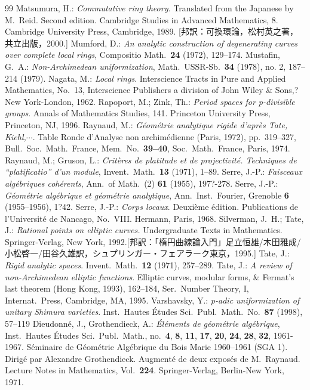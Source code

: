 \documentclass[a4paper,12pt, dvipdfmx]{jsbook}
\theoremstyle{plain}
\theoremstyle{definition}
\begin{document}
\begin{thebibliography}{99}
Matsumura, H.: {\sl Commutative ring theory.} Translated from the Japanese by M.\ Reid. Second edition. Cambridge Studies in Advanced Mathematics, 8. Cambridge University Press, Cambridge, 1989. [邦訳：可換環論，松村英之著，共立出版，2000.]
Mumford, D.: {\it An analytic construction of degenerating curves over complete local rings}, Compositio Math.\ {\bf 24} (1972), 129--174.
Mustafin, G.\ A.: {\it Non-Archimedean uniformization}, Math.\ USSR-Sb.\ {\bf 34} (1978), no. 2, 187--214 (1979).
Nagata, M.: {\it Local rings}. Interscience Tracts in Pure and Applied Mathematics, No.\ 13, Interscience Publishers a division of John Wiley \& Sons,? New York-London, 1962.
Rapoport, M.; Zink, Th.: {\it Period spaces for p-divisible groups}. Annals of Mathematics Studies, 141. Princeton University Press, Princeton, NJ, 1996.
Raynaud, M.: {\it G\'eom\'etrie analytique rigide d'apr\`es Tate, Kiehl,$\cdots $}. Table Ronde d'Analyse non archim\'edienne (Paris, 1972), pp.\ 319--327, Bull.\ Soc.\ Math.\ France, Mem.\ No.\ {\bf 39--40}, Soc.\ Math.\ France, Paris, 1974.
Raynaud, M.; Gruson, L.: {\it Crit\`eres de platitude et de projectivit\'e. Techniques de ``platificatio'' d'un module}, Invent.\ Math.\ {\bf 13} (1971), 1--89. 
Serre, J.-P.: {\it Faisceaux alg\'ebriques coh\'erents}, Ann.\ of Math.\ (2) {\bf 61} (1955), 197?-278.
Serre, J.-P.: {\it G\'eom\'etrie alg\'ebrique et g\'eom\'etrie analytique}, Ann.\ Inst.\ Fourier, Grenoble {\bf 6} (1955--1956), 1?42.
Serre, J.-P.: {\it Corps locaux}. Deuxi\`eme \'edition. Publications de l'Universit\'e de Nancago, No.\ VIII. Hermann, Paris, 1968.
Silverman, J.\ H.; Tate, J.: {\it Rational points on elliptic curves.} Undergraduate Texts in Mathematics. Springer-Verlag, New York, 1992.[邦訳：「楕円曲線論入門」足立恒雄/木田雅成/小松啓一/田谷久雄訳，シュプリンガー・フェアラーク東京，1995.]
Tate, J.: {\it Rigid analytic spaces}. Invent.\ Math.\ {\bf 12} (1971), 257--289.
Tate, J.: {\it A review of non-Archimedean elliptic functions}. Elliptic curves, modular forms, \& Fermat's last theorem (Hong Kong, 1993), 162--184, Ser.\ Number Theory, I, Internat.\ Press, Cambridge, MA, 1995.
Varshavsky, Y.: {\it p-adic uniformization of unitary Shimura varieties}. Inst.\ Hautes \'Etudes Sci.\ Publ.\ Math.\ No.\ {\bf 87} (1998), 57--119
Dieudonn\'e, J., Grothendieck, A.: {\it \'El\'ements de g\'eom\'etrie alg\'ebrique}, Inst.\ Hautes \'Etudes Sci.\ Publ.\ Math., no.\ {\bf 4}, {\bf 8}, {\bf 11}, {\bf 17}, {\bf 20}, {\bf 24}, {\bf 28}, {\bf 32}, 1961-1967.
 S\'eminaire de G\'eom\'etrie Alg\'ebrique du Bois Marie 1960--1961 (SGA 1). Dirig\'e par Alexandre Grothendieck. Augment\'e de deux expos\'es de M.\ Raynaud. Lecture Notes in Mathematics, Vol.\ {\bf 224}. Springer-Verlag, Berlin-New York, 1971.
\end{thebibliography}
{\small 
\printindex}
\end{document}
